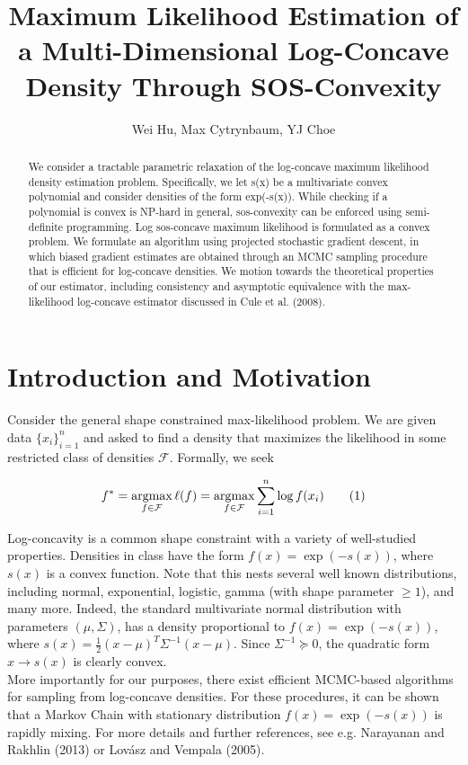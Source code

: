 \documentclass[11pt,reqno]{amsart}
\title{Maximum Likelihood Estimation of a Multi-Dimensional Log-Concave Density Through SOS-Convexity}
\author{Wei Hu, Max Cytrynbaum, YJ Choe}
\numberwithin{equation}{section}
\begin{document}
\maketitle

\begin{abstract}
We consider a tractable parametric relaxation of the log-concave maximum likelihood density estimation problem. Specifically, we let s(x) be a multivariate convex polynomial and consider densities of the form exp(-s(x)). While checking if a polynomial is convex is NP-hard in general, sos-convexity can be enforced using semi-definite programming. Log sos-concave maximum likelihood is formulated as a convex problem. We formulate an algorithm using projected stochastic gradient descent, in which biased gradient estimates are obtained through an MCMC sampling procedure that is efficient for log-concave densities. We motion towards the theoretical properties of our estimator, including consistency and asymptotic equivalence with the max-likelihood log-concave estimator discussed in Cule et al. (2008).

\end{abstract}

\section{Introduction and Motivation}

Consider the general shape constrained max-likelihood problem. We are given data $\{x_i\}_{i = 1}^n$ and asked to find a density that maximizes the likelihood in some restricted class of densities $\mathcal{F}$. Formally, we seek 

\[
f^* = \argmax_{f \in \mathcal{F}} \ell(f) = \argmax_{f \in \mathcal{F}} \sum_{i = 1}^n \log f(x_i) \qquad (1)
\]

Log-concavity is a common shape constraint with a variety of well-studied properties. Densities in class have the form $f(x) = \exp(-s(x))$, where $s(x)$ is a convex function. Note that this nests several well known distributions, including normal, exponential, logistic, gamma (with shape parameter $\geq 1$), and many more. Indeed, the standard multivariate normal distribution with parameters $(\mu, \Sigma)$, has a density proportional to $f(x) = \exp(-s(x))$, where $s(x) = \frac{1}{2}(x - \mu)^T \Sigma^{-1} (x - \mu)$. Since $\Sigma^{-1} \succeq 0$, the quadratic form $x \to s(x)$ is clearly convex. \\

More importantly for our purposes, there exist efficient MCMC-based algorithms for sampling from log-concave densities. For these  procedures, it can be shown that a Markov Chain with stationary distribution $f(x) = \exp(-s(x))$ is rapidly mixing. For more details and further references, see e.g. Narayanan and Rakhlin (2013) or Lov\'{a}sz and Vempala (2005). \\
\end{document}

